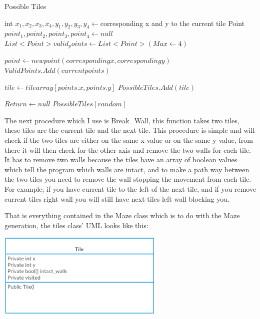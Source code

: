 \documentclass[12pt]{article}
\begin{document}
\begin{algorithm}[H]
\caption{Possible Tiles}
\begin{algorithmic}

\STATE int $x_1, x_2, x_3, x_4, y_1, y_2, y_3, y_4 \gets $corresponding x and y to the current tile
\STATE Point $point_1, point_2, point_3,  point_4 \gets null$
\STATE $List<Point> valid_points \gets List<Point>(Max \gets 4)$

	\STATE $point \gets new point(corresponding x, corresponding y)$
	\STATE $Valid Points.Add(current points)$
\ENDFOR

	\STATE $tile \gets tile array[points.x, points.y]$
		\STATE $Possible Tiles.Add(tile)$
	\ENDIF
\ENDFOR

	\STATE $Return \gets null$
\ELSE
	\STATE $Possible Tiles[random]$
\ENDIF

\end{algorithmic}
\end{algorithm}

The next procedure which I use is Break\_Wall, this function takes two tiles, these tiles are the current tile and the next tile. This procedure is simple and will check if the two tiles are either on the same x value or on the same y value, from there it will then check for the other axis and remove the two walls for each tile. It has to remove two walls because the tiles have an array of boolean values which tell the program which walls are intact, and to make a path way between the two tiles you need to remove the wall stopping the movement from each tile. For example; if you have current tile to the left of the next tile, and if you remove current tiles right wall you will still have next tiles left wall blocking you. 

That is everything contained in the Maze class which is to do with the Maze generation, the tiles class' UML looks like this:

\includegraphics[width = 0.6\textwidth]{UML_Tile_Maze-Generation} %
\end{document}
